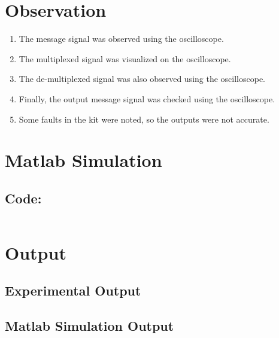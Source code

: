 \documentclass[12pt]{article}
\begin{document}
\section*{Observation}
\begin{enumerate}
    \item The message signal was observed using the oscilloscope.
    \item The multiplexed signal was visualized on the oscilloscope.
    \item The de-multiplexed signal was also observed using the oscilloscope.
    \item Finally, the output message signal was checked using the oscilloscope.
    \item Some faults in the kit were noted, so the outputs were not accurate.
\end{enumerate}

\section*{Matlab Simulation}

\subsection*{Code:}

\inputminted[linenos,breaklines,breakanywhere]{matlab}{./assets/tdm.m}

\section*{Output}

\subsection*{Experimental Output}


\subsection*{Matlab Simulation Output}

\end{document}
